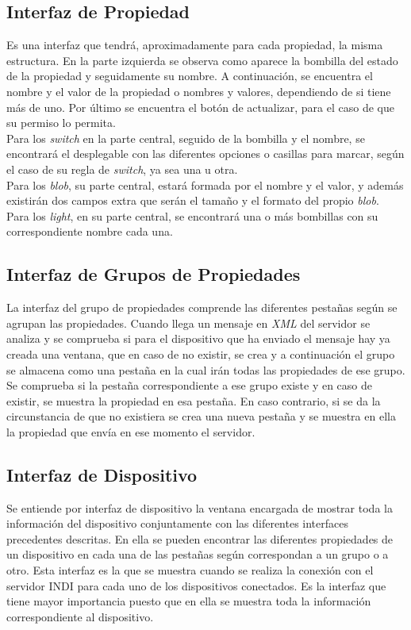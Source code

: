 \subsection{Interfaz de Propiedad}
Es una interfaz que tendrá, aproximadamente para cada propiedad, la misma estructura.
En la parte izquierda se observa como aparece la bombilla del estado de la propiedad y seguidamente su nombre. A continuación, se encuentra el nombre y el valor de la propiedad o nombres y valores, dependiendo de si tiene más de uno. Por último se encuentra el botón de actualizar, para el caso de que su permiso lo permita.\\

Para los \textit{switch} en la parte central, seguido de la bombilla y el nombre, se encontrará el desplegable con las diferentes opciones o casillas para marcar, según el caso de  su regla de \textit{switch}, ya  sea una u otra.\\

Para los \textit{blob}, su parte central, estará formada por el nombre y el valor, y además existirán dos campos extra que serán el tamaño y el formato del propio \textit{blob}.\\

Para los \textit{light}, en su parte central, se encontrará una o más bombillas con su correspondiente nombre cada una.

\subsection{Interfaz de Grupos de Propiedades}
La interfaz del grupo de propiedades comprende las diferentes pestañas según se agrupan las propiedades. Cuando llega un mensaje en \textit{XML} del servidor se analiza y se comprueba si para el dispositivo que ha enviado el mensaje hay ya creada una ventana, que en caso de no existir, se crea y a continuación el grupo se almacena como una pestaña en la cual irán todas las propiedades de ese grupo.
Se comprueba si la pestaña correspondiente a ese grupo existe y en caso de existir, se muestra la propiedad en esa pestaña. En caso contrario, si se da la circunstancia de que no existiera se crea una nueva pestaña y se muestra en ella la propiedad que envía en ese momento el servidor.\\

\subsection{Interfaz de Dispositivo}
Se entiende por interfaz de dispositivo la ventana encargada de mostrar toda la información del dispositivo conjuntamente con las diferentes interfaces precedentes descritas. En ella se pueden encontrar las diferentes propiedades de un dispositivo en cada una de las pestañas según correspondan a un grupo o a otro. Esta interfaz es la que se muestra cuando se realiza la conexión con el servidor INDI para cada uno de los dispositivos conectados. Es la interfaz que tiene mayor importancia puesto que en ella se muestra toda la información correspondiente al dispositivo.


